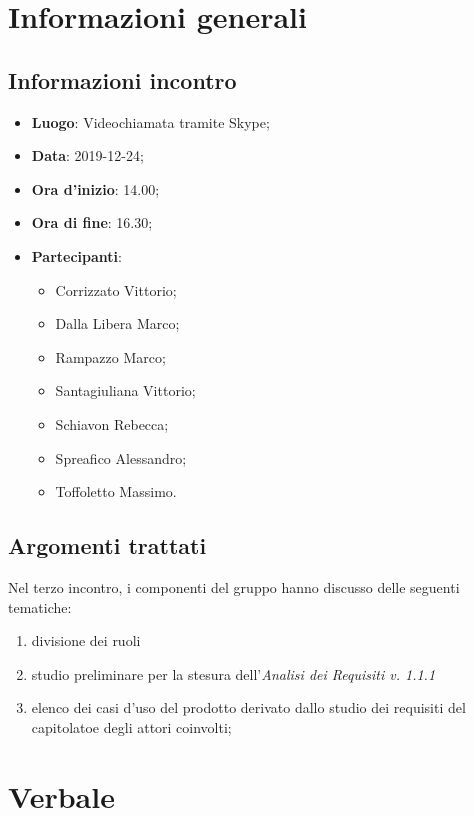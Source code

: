 \section{Informazioni generali}
    \subsection{Informazioni incontro}
        \begin{itemize}
            \item \textbf{Luogo}: Videochiamata tramite Skype;
            \item \textbf{Data}: 2019-12-24;
            \item \textbf{Ora d'inizio}: 14.00;
            \item \textbf{Ora di fine}: 16.30;
            \item \textbf{Partecipanti}: 
            \begin{itemize}
                \item Corrizzato Vittorio;
                \item Dalla Libera Marco;
                \item Rampazzo Marco;
                \item Santagiuliana Vittorio;
                \item Schiavon Rebecca;
                \item Spreafico Alessandro;
                \item Toffoletto Massimo.
            \end{itemize}
        \end{itemize}
    \subsection{Argomenti trattati}
        Nel terzo incontro, i componenti del gruppo hanno discusso delle seguenti tematiche:
        \begin{enumerate}
        	\item divisione dei ruoli 
        	\item studio preliminare per la stesura dell'\textit{Analisi dei Requisiti v. 1.1.1}
            \item elenco dei casi d'uso del prodotto derivato dallo studio dei requisiti del capitolato\glosp e degli attori coinvolti;
        \end{enumerate}
\section{Verbale}
